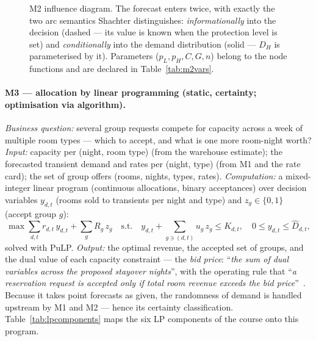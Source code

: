 \begin{figure}[H]
\centering
{}
\caption{M2 influence diagram. The forecast enters twice, with exactly the two arc semantics Shachter distinguishes: \emph{informationally} into the decision (dashed --- its value is known when the protection level is set) and \emph{conditionally} into the demand distribution (solid --- $D_H$ is parameterised by it). Parameters ($p_L, p_H, C, G, n$) belong to the node functions and are declared in Table~\ref{tab:m2vars}.}
\label{fig:id-m2}
\end{figure}

\paragraph{M3 --- allocation by linear programming (static, certainty; optimisation via algorithm).}
\emph{Business question:} several group requests compete for capacity across a week of multiple room types --- which to accept, and what is one more room-night worth? \emph{Input:} capacity per (night, room type) (from the warehouse estimate); the forecasted transient demand and rates per (night, type) (from M1 and the rate card); the set of group offers (rooms, nights, types, rates). \emph{Computation:} a mixed-integer linear program (continuous allocations, binary acceptances) over decision variables $y_{d,t}$ (rooms sold to transients per night and type) and $z_g \in \{0,1\}$ (accept group $g$):
\begin{equation}
\max \sum_{d,t} r_{d,t}\, y_{d,t} + \sum_{g} R_g\, z_g
\quad\text{s.t.}\quad
y_{d,t} + \sum_{g \ni (d,t)} u_{g}\, z_g \le K_{d,t}, \quad
0 \le y_{d,t} \le \hat{D}_{d,t},
\label{eq:m3lp}
\end{equation}
solved with PuLP. \emph{Output:} the optimal revenue, the accepted set of groups, and the dual value of each capacity constraint --- the \emph{bid price}: ``\emph{the sum of dual variables across the proposed stayover nights}'', with the operating rule that ``\emph{a reservation request is accepted only if total room revenue exceeds the bid price}''~\cite{pimentel2019}. Because it takes point forecasts as given, the randomness of demand is handled upstream by M1 and M2 --- hence its certainty classification. Table~\ref{tab:lpcomponents} maps the six LP components of the course onto this program.

